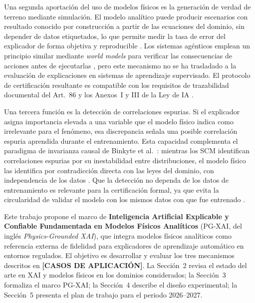 \documentclass[11pt,a4paper]{article}
\begin{document}
Una segunda aportación del uso de modelos físicos es la generación de
verdad de terreno mediante simulación.
El modelo analítico puede producir escenarios con resultado conocido por construcción
a partir de las ecuaciones del dominio, sin depender de datos etiquetados,
lo que permite medir la tasa de error del explicador de forma objetiva y reproducible
\cite{haufe2026explainable, qi2026towards}.
Los sistemas agénticos emplean un principio similar mediante \textit{world models}
para verificar las consecuencias de acciones antes de ejecutarlas \cite{qi2026towards},
pero este mecanismo no se ha trasladado a la evaluación de explicaciones en sistemas
de aprendizaje supervisado.
El protocolo de certificación resultante es compatible con los requisitos de
trazabilidad documental del Art.~86 y los Anexos~I y III de la Ley de IA
\cite{eu_ai_act_2024}.

Una tercera función es la detección de correlaciones espurias.
Si el explicador asigna importancia elevada a una variable que el modelo físico indica
como irrelevante para el fenómeno, esa discrepancia señala una posible correlación
espuria aprendida durante el entrenamiento.
Esta capacidad complementa el paradigma de invarianza causal de Binkyte et al.\
\cite{binkyte2026trustworthy}: mientras los SCM identifican correlaciones espurias
por su inestabilidad entre distribuciones, el modelo físico las identifica por
contradicción directa con las leyes del dominio, con independencia de los datos
\cite{binkyte2026causality, lyberatos2026xai}.
Que la detección no dependa de los datos de entrenamiento es relevante para la
certificación formal, ya que evita la circularidad de validar el modelo con los
mismos datos con que fue entrenado \cite{eu_ai_act_2024}.

Este trabajo propone el marco de \textbf{Inteligencia Artificial Explicable y Confiable
Fundamentada en Modelos Físicos Analíticos} (PG-XAI, del inglés
\textit{Physics-Grounded XAI}), que integra modelos físicos analíticos como
referencia externa de fidelidad para explicadores de aprendizaje automático
en entornos regulados.
El objetivo es desarrollar y evaluar los tres mecanismos descritos en
\textbf{[CASOS DE APLICACIÓN]}.
La Sección~2 revisa el estado del arte en XAI y modelos físicos en los
dominios considerados; la Sección~3 formaliza el marco PG-XAI;
la Sección~4 describe el diseño experimental; la Sección~5 presenta
el plan de trabajo para el periodo 2026--2027.



\end{document}
